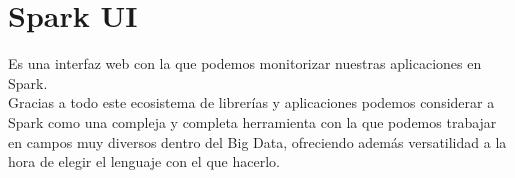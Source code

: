 \section{Spark UI}
Es una interfaz web con la que podemos monitorizar nuestras aplicaciones en Spark.\\

\vspace*{3.5\baselineskip}
Gracias a todo este ecosistema de librerías y aplicaciones podemos considerar a Spark como una compleja y completa herramienta con la que podemos trabajar en campos muy diversos dentro del Big Data, ofreciendo además versatilidad a la hora de elegir el lenguaje con el que hacerlo.